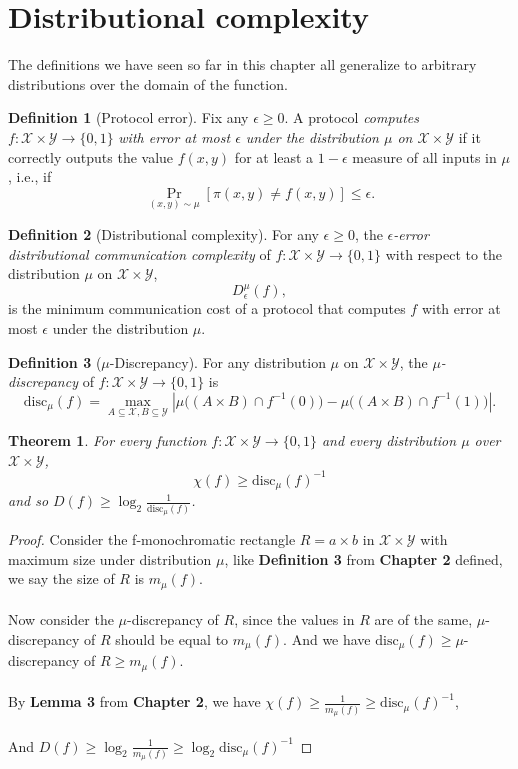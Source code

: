 \documentclass[11pt,oneside]{book}
\theoremstyle{plain}
\newtheorem{theorem}{Theorem}
\theoremstyle{definition}
\newtheorem{definition}{Definition}
\theoremstyle{plain}
\newcommand{\calX}{\mathcal{X}}
\newcommand{\calY}{\mathcal{Y}}
\newcommand{\disc}{\mathrm{disc}}
\begin{document}
 \section{Distributional complexity}

The definitions we have seen so far in this chapter all generalize to arbitrary distributions over the domain of the function.

\begin{definition}[Protocol error]
	Fix any $\epsilon \ge 0$. A protocol \emph{computes} $f : \calX \times \calY \to \{0,1\}$ \emph{with error at most $\epsilon$ under the distribution $\mu$ on $\calX \times \calY$} if it correctly outputs the value $f(x,y)$ for at least a $1-\epsilon$ measure of all inputs in $\mu$, i.e., if
	\[
	\Pr_{(x,y) \sim \mu}[ \pi(x,y) \neq f(x,y) ] \le \epsilon.
	\]
\end{definition}

\begin{definition}[Distributional complexity]
	For any $\epsilon \ge 0$, the \emph{$\epsilon$-error distributional communication complexity} of $f : \calX \times \calY \to \{0,1\}$ with respect to the distribution $\mu$ on $\calX \times \calY$,
	\[
	D_\epsilon^{\mu}(f),
	\]
	is the minimum communication cost of a protocol that computes $f$ with error at most $\epsilon$ under the distribution $\mu$.
\end{definition}

\begin{definition}[$\mu$-Discrepancy]
	For any distribution $\mu$ on $\calX \times \calY$, 
	the \emph{$\mu$-discrepancy} of $f : \calX \times \calY \to \{0,1\}$ is
	\[
	\disc_\mu(f) = \max_{A \subseteq \calX, B \subseteq \calY} 
	\left| \mu\big( (A \times B) \cap f^{-1}(0) \big) - \mu\big( (A \times B) \cap f^{-1}(1)\big) \right|.
	\]
\end{definition}

\begin{theorem}
	For every function $f : \calX \times \calY \to \{0,1\}$ and every distribution $\mu$ over $\calX \times \calY$, 
	\[
	\chi(f) \ge \disc_\mu(f)^{-1}
	\] 
	and so $D(f) \ge \log_2 \frac1{\disc_\mu(f)}$.
\end{theorem}

\begin{proof}
	Consider the f-monochromatic rectangle $R = a \times b$ in $\calX \times \calY$ with maximum size under distribution $\mu$, like \textbf{Definition 3} from \textbf{Chapter 2} defined, we say the size of $R$ is $m_{\mu}(f)$.\\
	\\
	Now consider the $\mu$-discrepancy of $R$, since the values in $R$ are of the same, $\mu$-discrepancy of $R$ should be equal to $m_{\mu}(f)$. And we have $\disc_\mu(f) \ge \mu$-discrepancy of $R \ge m_{\mu}(f)$.\\
	\\
	By \textbf{Lemma 3} from \textbf{Chapter 2}, we have $\chi(f) \ge \frac{1}{m_\mu(f)} \ge \disc_\mu(f)^{-1}$,\\
	\\
	And $D(f) \ge \log_2 \frac{1}{m_\mu(f)} \ge \log_2 \disc_\mu(f)^{-1}$
	
\end{proof}
\end{document}
